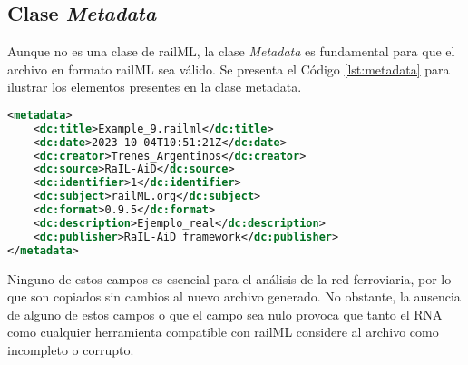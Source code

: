 \subsection{Clase \textit{Metadata}}
    \label{sec:metadata}

    Aunque no es una clase de railML, la clase \textit{Metadata} es fundamental para que el archivo en formato railML sea válido. Se presenta el Código \ref{lst:metadata} para ilustrar los elementos presentes en la clase metadata.
    
    \begin{lstlisting}[language = XML, caption = Clase \textit{Metadata}, label = {lst:metadata}]
<metadata>
    <dc:title>Example_9.railml</dc:title>
    <dc:date>2023-10-04T10:51:21Z</dc:date>
    <dc:creator>Trenes_Argentinos</dc:creator>
    <dc:source>RaIL-AiD</dc:source>
    <dc:identifier>1</dc:identifier>
    <dc:subject>railML.org</dc:subject>
    <dc:format>0.9.5</dc:format>
    <dc:description>Ejemplo_real</dc:description>
    <dc:publisher>RaIL-AiD framework</dc:publisher>
</metadata>
    \end{lstlisting}

    Ninguno de estos campos es esencial para el análisis de la red ferroviaria, por lo que son copiados sin cambios al nuevo archivo generado. No obstante, la ausencia de alguno de estos campos o que el campo sea nulo provoca que tanto el RNA como cualquier herramienta compatible con railML considere al archivo como incompleto o corrupto.